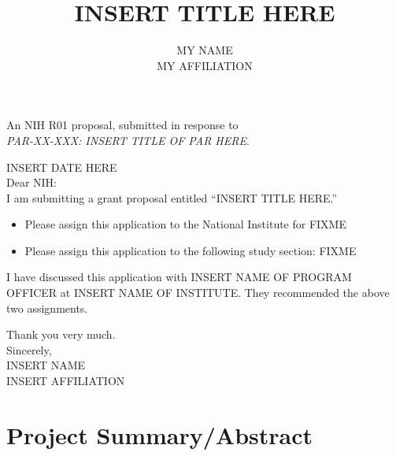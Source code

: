 \documentclass[11pt]{article}
\title{INSERT TITLE HERE}
\author{MY NAME\\
MY AFFILIATION}
\begin{document}
\maketitle

\begin{center}
An NIH R01 proposal, submitted in response to \\
{\em PAR-XX-XXX: INSERT TITLE OF PAR HERE}.
\end{center}

\clearpage

\noindent
INSERT DATE HERE\\[2ex]

\noindent
Dear NIH:\\[1ex]

I am submitting a grant proposal entitled ``INSERT TITLE HERE.''

\begin{itemize}
\item Please assign this application to the National Institute for
  FIXME
\item Please assign this application to the following study section:
  FIXME
\end{itemize}
I have discussed this application with INSERT NAME OF PROGRAM OFFICER
at INSERT NAME OF INSTITUTE.  They recommended the above two
assignments.

Thank you very much.\\[1ex]
 
\noindent
Sincerely,\\[2ex]

\noindent
INSERT NAME\\
INSERT AFFILIATION


\clearpage
\section*{Project Summary/Abstract}
\end{document}
